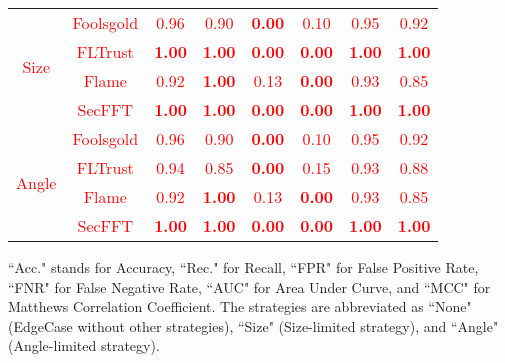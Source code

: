\documentclass[lettersize,journal]{IEEEtran}
\begin{document}
\begin{table}[h!]
{\begin{tabular}{c|c|c|c|c|c|c|c}
\multirow{4}{*}{\textcolor{red}{Size}} & \textcolor{red}{Foolsgold} & \textcolor{red}{0.96} & \textcolor{red}{0.90} & \textbf{\textcolor{red}{0.00}} & \textcolor{red}{0.10} & \textcolor{red}{0.95} & \textcolor{red}{0.92} \\ 
                        & \textcolor{red}{FLTrust}   & \textbf{\textcolor{red}{1.00}} & \textbf{\textcolor{red}{1.00}} & \textbf{\textcolor{red}{0.00}} & \textbf{\textcolor{red}{0.00}} & \textbf{\textcolor{red}{1.00}} & \textbf{\textcolor{red}{1.00}} \\ 
                        & \textcolor{red}{Flame}     & \textcolor{red}{0.92} & \textbf{\textcolor{red}{1.00}} & \textcolor{red}{0.13} & \textbf{\textcolor{red}{0.00}} & \textcolor{red}{0.93} & \textcolor{red}{0.85} \\ 
                        & \textcolor{red}{SecFFT}    & \textbf{\textcolor{red}{1.00}} & \textbf{\textcolor{red}{1.00}} & \textbf{\textcolor{red}{0.00}} & \textbf{\textcolor{red}{0.00}} & \textbf{\textcolor{red}{1.00}} & \textbf{\textcolor{red}{1.00}} \\ \hline

\multirow{4}{*}{\textcolor{red}{Angle}} & \textcolor{red}{Foolsgold} & \textcolor{red}{0.96} & \textcolor{red}{0.90} & \textbf{\textcolor{red}{0.00}} & \textcolor{red}{0.10} & \textcolor{red}{0.95} & \textcolor{red}{0.92} \\ 
                        & \textcolor{red}{FLTrust}   & \textcolor{red}{0.94} & \textcolor{red}{0.85} & \textbf{\textcolor{red}{0.00}} & \textcolor{red}{0.15} & \textcolor{red}{0.93} & \textcolor{red}{0.88} \\ 
                        & \textcolor{red}{Flame}     & \textcolor{red}{0.92} & \textbf{\textcolor{red}{1.00}} & \textcolor{red}{0.13} & \textbf{\textcolor{red}{0.00}} & \textcolor{red}{0.93} & \textcolor{red}{0.85} \\ 
                        & \textcolor{red}{SecFFT}    & \textbf{\textcolor{red}{1.00}} & \textbf{\textcolor{red}{1.00}} & \textbf{\textcolor{red}{0.00}} & \textbf{\textcolor{red}{0.00}} & \textbf{\textcolor{red}{1.00}} & \textbf{\textcolor{red}{1.00}} \\ \hline

\end{tabular}
}
\vspace{1em}
\begin{tablenotes}
\scriptsize
\item ``Acc." stands for Accuracy, ``Rec." for Recall, ``FPR" for False Positive Rate, ``FNR" for False Negative Rate, ``AUC" for Area Under Curve, and ``MCC" for Matthews Correlation Coefficient. The strategies are abbreviated as ``None" (EdgeCase without other strategies), ``Size" (Size-limited strategy), and ``Angle" (Angle-limited strategy).
\end{tablenotes}
\label{tab:detect}
\end{table}
\end{document}
